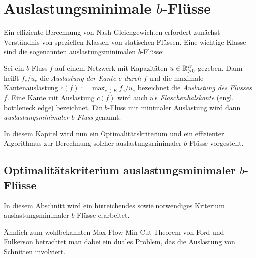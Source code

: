 \chapter{Auslastungsminimale $b$-Flüsse}

Ein effiziente Berechnung von Nash-Gleichgewichten erfordert zunächst Verständnis von speziellen Klassen von statischen Flüssen.
Eine wichtige Klasse sind die sogenannten auslastungsminimalen $b$-Flüsse:

\begin{definition}
	Sei ein $b$-Fluss $f$ auf einem Netzwerk mit Kapazitäten $u\in\mathbb{R}_{>0}^E$ gegeben.
	Dann heißt $f_e/u_e$ die \emph{Auslastung der Kante $e$ durch $f$} und die maximale Kantenauslastung $c(f):=\max_{e\in E} f_e/u_e$ bezeichnet die \emph{Auslastung des Flusses $f$}.
	Eine Kante mit Auslastung $c(f)$ wird auch als \emph{Flaschenhalskante} (engl. bottleneck edge) bezeichnet.
	Ein $b$-Fluss mit minimaler Auslastung wird dann \emph{auslastungsminimaler $b$-Fluss} genannt.
\end{definition}

In diesem Kapitel wird nun ein Optimalitätskriterium und ein effizienter Algorithmus zur Berechnung solcher auslastungsminimaler $b$-Flüsse vorgestellt.

\section{Optimalitätskriterium auslastungsminimaler $b$-Flüsse}

In diesem Abschnitt wird ein hinreichendes sowie notwendiges Kriterium auslastungsminimaler $b$-Flüsse erarbeitet.

Ähnlich zum wohlbekannten Max-Flow-Min-Cut-Theorem von Ford und Fulkerson betrachtet man dabei ein duales Problem, das die Auslastung von Schnitten involviert.

